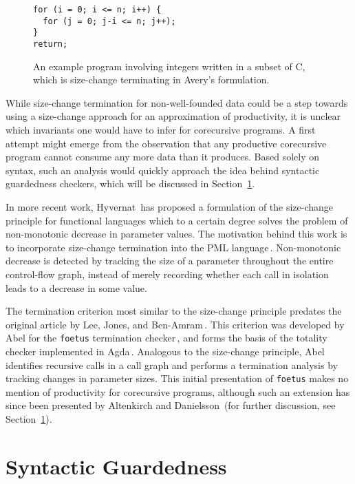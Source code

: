 \begin{figure}
\begin{lstlisting}
for (i = 0; i <= n; i++) {
  for (j = 0; j-i <= n; j++);
}
return;
\end{lstlisting}
\caption{An example program involving integers written in a subset of C, which is size-change terminating in Avery's formulation.}
\label{fig:avery_example}
\end{figure}

While size-change termination for non-well-founded data could be a step towards using a size-change approach for an approximation of productivity, it is unclear which invariants one would have to infer for corecursive programs. A first attempt might emerge from the observation that any productive corecursive program cannot consume any more data than it produces. Based solely on syntax, such an analysis would quickly approach the idea behind syntactic guardedness checkers, which will be discussed in Section~\ref{sec:synt-guard}.

In more recent work, Hyvernat\,\citep{Hyvernat13} has proposed a formulation of the size-change principle for functional languages which to a certain degree solves the problem of non-monotonic decrease in parameter values. The motivation behind this work is to incorporate size-change termination into the PML language\,\cite{PMLLanguage}. Non-monotonic decrease is detected by tracking the size of a parameter throughout the entire control-flow graph, instead of merely recording whether each call in isolation leads to a decrease in some value.

The termination criterion most similar to the size-change principle predates the original article by Lee, Jones, and Ben-Amram\,\citep{LeeJones01SizeChange}. This criterion was developed by Abel for the \texttt{foetus} termination checker\,\citep{Abel98foetus}, and forms the basis of the totality checker implemented in Agda\,\citep{Norell:thesis}. Analogous to the size-change principle, Abel identifies recursive calls in a call graph and performs a termination analysis by tracking changes in parameter sizes. This initial presentation of \texttt{foetus} makes no mention of productivity for corecursive programs, although such an extension has since been presented by Altenkirch and Danielsson\,\citep{AltenkirchNAD10} (for further discussion, see Section~\ref{sec:synt-guard}).

\section{Syntactic Guardedness}
\label{sec:synt-guard}


